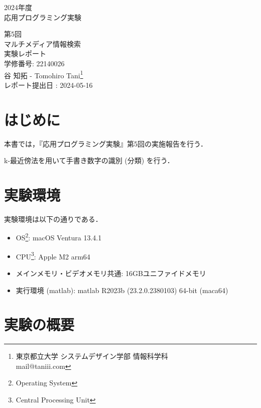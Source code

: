 \documentclass[fleqn, a4paper. 12pt]{jsarticle}
\begin{document}
  \begin{titlepage}
    \begin{center}
      {\Huge 2024年度\\応用プログラミング実験}
      
      \vspace{4cm}
      {\Huge 第5回\\マルチメディア情報検索\\
        実験レポート\\
      }
      \vspace{4cm}
      {\large 学修番号: 22140026\\谷 知拓 - Tomohiro Tani\footnote{東京都立大学 システムデザイン学部 情報科学科 \\ mail@taniii.com} \\}
      \vspace{0.5cm}
      {\large
        レポート提出日 : 2024-05-16 \\
      }
    \end{center}
  \end{titlepage}
  
  \section{はじめに}
    本書では，『応用プログラミング実験』第5回の実施報告を行う．

    k-最近傍法を用いて手書き数字の識別 (分類) を行う．

  \section{実験環境}

    実験環境は以下の通りである．

    \begin{itemize}
      \item OS\footnote{Operating System}: macOS Ventura 13.4.1
      \item CPU\footnote{Central Processing Unit}: Apple M2 arm64\footnotemark[4]
      \item メインメモリ・ビデオメモリ共通: 16GBユニファイドメモリ\footnotemark[4]
      \item 実行環境 (matlab): matlab R2023b (23.2.0.2380103) 64-bit (maca64)
    \end{itemize}

  \section{実験の概要}
\end{document}
